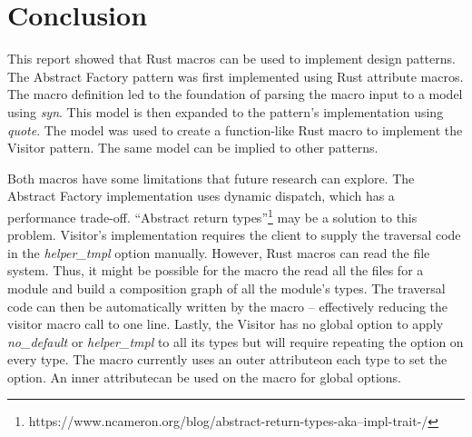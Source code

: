 \section{Conclusion}
This report showed that Rust macros can be used to implement design patterns.
The Abstract Factory pattern was first implemented using Rust attribute macros.
The macro definition led to the foundation of parsing the macro input to a model using \textit{syn}.
This model is then expanded to the pattern's implementation using \textit{quote}.
The model was used to create a function-like Rust macro to implement the Visitor pattern.
The same model can be implied to other patterns.

Both macros have some limitations that future research can explore.
The Abstract Factory implementation uses dynamic dispatch, which has a performance trade-off.
``Abstract return types''\footnote{https://www.ncameron.org/blog/abstract-return-types-aka--impl-trait-/} may be a solution to this problem.
Visitor's implementation requires the client to supply the traversal code in the \textit{helper\_tmpl} option manually.
However, Rust macros can read the file system.
Thus, it might be possible for the macro the read all the files for a module and build a composition graph of all the module's types.
The traversal code can then be automatically written by the macro -- effectively reducing the visitor macro call to one line.
Lastly, the Visitor has no global option to apply \textit{no\_default} or \textit{helper\_tmpl} to all its types but will require repeating the option on every type.
The macro currently uses an outer attribute\footnotemark on each type to set the option.
An inner attribute\footnotemark[\value{footnote}] can be used on the macro for global options.

